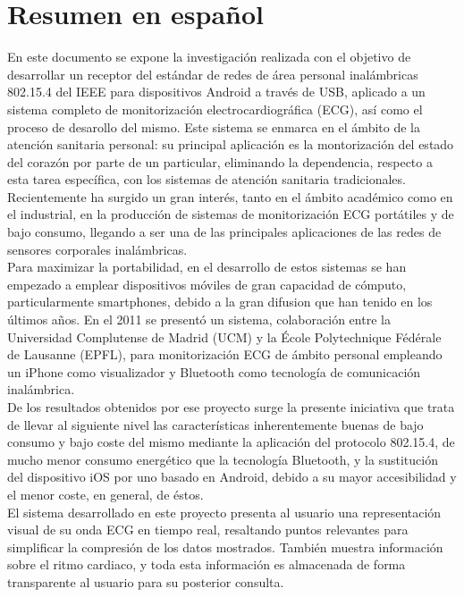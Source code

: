 \chapter{Resumen en español}
\label{ch:resumen}
	En este documento se expone la investigación realizada con el objetivo de desarrollar un receptor del estándar de redes de área personal inalámbricas 802.15.4 del IEEE para dispositivos Android a través de USB, aplicado a un sistema completo de monitorización electrocardiográfica (ECG), así como el proceso de desarollo del mismo. Este sistema se enmarca en el ámbito de la atención sanitaria personal: su principal aplicación es la montorización del estado del corazón por parte de un particular, eliminando la dependencia, respecto a esta tarea específica, con los sistemas de atención sanitaria tradicionales.\\

	Recientemente ha surgido un gran interés, tanto en el ámbito académico como en el industrial, en la producción de sistemas de monitorización ECG portátiles y de bajo consumo, llegando a ser una de las principales aplicaciones de las redes de sensores corporales inalámbricas.\\

	Para maximizar la portabilidad, en el desarrollo de estos sistemas se han empezado a emplear dispositivos móviles de gran capacidad de cómputo, particularmente smartphones, debido a la gran difusion que han tenido en los últimos años. En el 2011  se presentó un sistema, colaboración entre la Universidad Complutense de Madrid (UCM) y la École Polytechnique Fédérale de Lausanne (EPFL), para monitorización ECG de ámbito personal empleando un iPhone como visualizador y Bluetooth como tecnología de comunicación inalámbrica.\\

	De los resultados obtenidos por ese proyecto surge la presente iniciativa que trata de llevar al siguiente nivel las características inherentemente buenas de bajo consumo y bajo coste del mismo mediante la aplicación del protocolo 802.15.4, de mucho menor consumo energético que la tecnología Bluetooth, y la sustitución del dispositivo iOS por uno basado en Android, debido a su mayor accesibilidad y el menor coste, en general, de éstos.\\

	El sistema desarrollado en este proyecto presenta al usuario una representación visual de su onda ECG en tiempo real, resaltando puntos relevantes para simplificar la compresión de los datos mostrados. También muestra información sobre el ritmo cardiaco, y toda esta información es almacenada de forma transparente al usuario para su posterior consulta.\\

